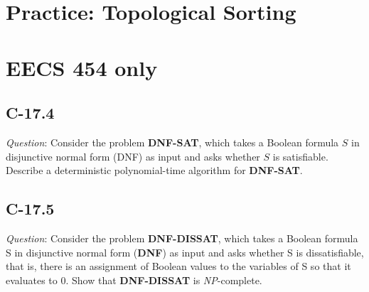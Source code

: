 \documentclass[11pt]{article}
\begin{document}
\section{Practice: Topological Sorting}
\section{EECS 454 only}
\subsection{C-17.4}
\noindent \emph{Question}: Consider the problem \textbf{DNF-SAT}, which takes a Boolean formula $S$ in disjunctive normal form (DNF) as input and asks whether $S$ is satisfiable. Describe a deterministic polynomial-time algorithm for \textbf{DNF-SAT}.
\subsection{C-17.5}
\noindent \emph{Question}: Consider the problem \textbf{DNF-DISSAT}, which takes a Boolean formula S in disjunctive normal form (\textbf{DNF}) as input and asks whether S is dissatisfiable, that is, there is an assignment of Boolean values to the variables of S so that it evaluates to 0. Show that \textbf{DNF-DISSAT} is \emph{NP}-complete.
\end{document}
